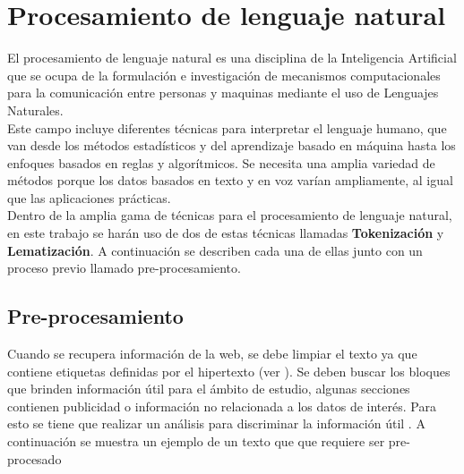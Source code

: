 
\section[Procesamiento de LN]{Procesamiento de lenguaje natural}

El procesamiento de lenguaje natural es una disciplina de la Inteligencia Artificial que se ocupa de la formulación e 
investigación de mecanismos computacionales para la comunicación entre personas y maquinas mediante el uso de Lenguajes 
Naturales.\\

Este campo incluye diferentes técnicas para interpretar el lenguaje humano, que van desde los métodos 
estadísticos y del aprendizaje basado en máquina hasta los enfoques basados en reglas y algorítmicos. Se necesita una amplia variedad 
de métodos porque los datos basados en texto y en voz varían ampliamente, al igual que las aplicaciones prácticas.\\

Dentro de la amplia gama de técnicas para el procesamiento de lenguaje natural, en este trabajo se harán uso de dos de estas técnicas llamadas \textbf{Tokenización} y \textbf{Lematización}. A continuación se describen cada una de ellas junto con un proceso previo llamado pre-procesamiento.\\



\subsection[Pre-procesamiento]{Pre-procesamiento}


Cuando se recupera  información de la web, se debe limpiar el texto ya que contiene etiquetas definidas por el hipertexto (ver ). Se deben buscar los bloques que brinden información útil para el ámbito de estudio, algunas secciones contienen publicidad o información no relacionada a los datos de interés. Para esto se tiene que realizar un análisis para discriminar la información útil \citep{CD1}. A continuación se muestra un ejemplo de un texto que que requiere ser pre-procesado\\

